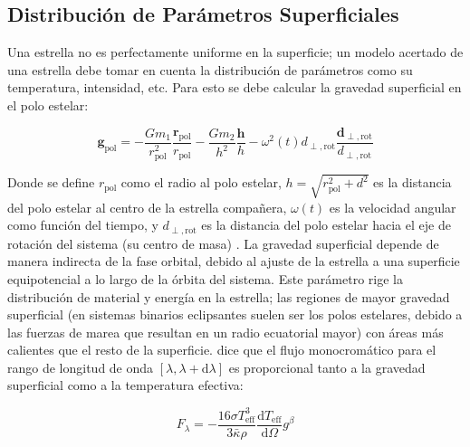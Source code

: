 \subsection{Distribución de Parámetros Superficiales}

Una estrella no es perfectamente uniforme en la superficie; un modelo acertado
de una estrella debe tomar en cuenta la distribución de parámetros como su
temperatura, intensidad, etc. Para esto se debe calcular la gravedad superficial
en el polo estelar:

\begin{eqfloat}[!ht]
	\centering
	\begin{equation}
		\textbf{g}_{\textrm{pol}} = -\frac{G m_1}{r_{\textrm{pol}}^2} \frac{\textbf{r}_{\mathrm{pol}}}{r_{\mathrm{pol}}} - \frac{G m_2}{h^2} \frac{\textbf{h}}{h} - \omega^2(t) d_{\perp,\textrm{rot}} \frac{\textbf{d}_{\perp,\textrm{rot}}}{d_{\perp,\textrm{rot}}} 
	\end{equation}
\end{eqfloat}

Donde se define $r_{\mathrm{pol}}$ como el radio al polo estelar, $h =
\sqrt{r_{\mathrm{pol}}^2 + d^2}$ es la distancia del polo estelar al centro de
la estrella compañera, $\omega(t)$ es la velocidad angular como función del
tiempo, y $d_{\perp,\textrm{rot}}$ es la distancia del polo estelar hacia el eje
de rotación del sistema (su centro de masa)
. La gravedad superficial
depende de manera indirecta de la fase orbital, debido al ajuste de la estrella
a una superficie equipotencial a lo largo de la órbita del sistema. Este
parámetro rige la distribución de material y energía en la estrella; las
regiones de mayor gravedad superficial (en sistemas binarios eclipsantes suelen
ser los polos estelares, debido a las fuerzas de marea que resultan en un radio
ecuatorial mayor) con áreas más calientes que el resto de la superficie.
 dice que el flujo
monocromático para el rango de longitud de onda $[\lambda, \lambda +
\mathrm{d}\lambda]$ es proporcional tanto a la gravedad superficial como a la
temperatura efectiva:

\begin{eqfloat}[!ht]
	\centering
	\begin{equation}
		F_{\lambda} = - \frac{16 \sigma T_{\textrm{eff}}^3}{3 \bar{\kappa} \rho} \frac{\textrm{d}T_{\textrm{eff}}}{\textrm{d}\Omega} g^{\beta}
	\end{equation}
\end{eqfloat}

